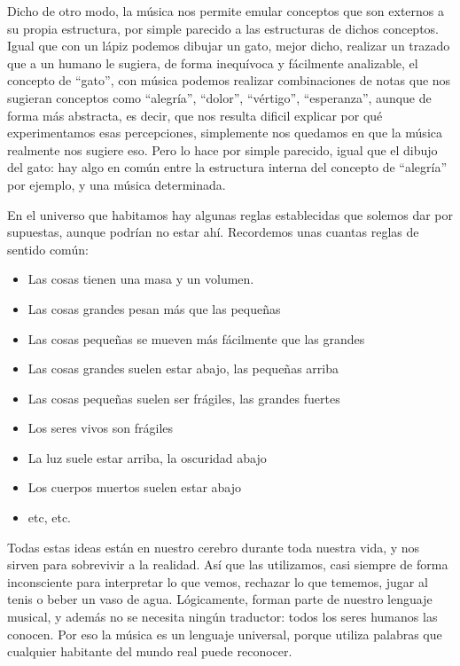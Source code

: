 \documentclass[]{article}
\providecommand{\tightlist}{%
  \setlength{
\itemsep}{0pt}\setlength{\parskip}{0pt}}
\begin{document}
Dicho de otro modo, la música nos permite emular conceptos que son externos a su propia estructura, por simple parecido a las estructuras de dichos conceptos. Igual que con un lápiz podemos dibujar un gato, mejor dicho, realizar un trazado que a un humano le sugiera, de forma inequívoca y fácilmente analizable, el concepto de ``gato'', con música podemos realizar combinaciones de notas que nos sugieran conceptos como ``alegría'', ``dolor'', ``vértigo'', ``esperanza'', aunque de forma más abstracta, es decir, que nos resulta dificil explicar por qué experimentamos esas percepciones, simplemente nos quedamos en que la música realmente nos sugiere eso. Pero lo hace por simple parecido, igual que el dibujo del gato: hay algo en común entre la estructura interna del concepto de ``alegría'' por ejemplo, y una música determinada.

En el universo que habitamos hay algunas reglas establecidas que solemos dar por supuestas, aunque podrían no estar ahí. Recordemos unas cuantas reglas de sentido común:

\begin{itemize}   \tightlist
  \item         Las cosas tienen una masa y un volumen.
  \item         Las cosas grandes pesan más que las pequeñas
  \item         Las cosas pequeñas se mueven más fácilmente que las grandes
  \item         Las cosas grandes suelen estar abajo, las pequeñas arriba
  \item         Las cosas pequeñas suelen ser frágiles, las grandes fuertes
  \item         Los seres vivos son frágiles
  \item         La luz suele estar arriba, la oscuridad abajo
  \item         Los cuerpos muertos suelen estar abajo
  \item         etc, etc.
\end{itemize}

Todas estas ideas están en nuestro cerebro durante toda nuestra vida, y nos sirven para sobrevivir a la realidad. Así que las         utilizamos, casi siempre de forma inconsciente para interpretar lo que         vemos, rechazar lo que tememos, jugar al tenis o beber un vaso de         agua. Lógicamente, forman parte de nuestro lenguaje musical, y además         no se necesita ningún traductor: todos los seres humanos las conocen.         Por eso la música es un lenguaje universal, porque utiliza palabras         que cualquier habitante del mundo real puede reconocer.
\end{document}
